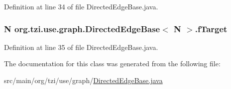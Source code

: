 Definition at line 34 of file Directed\-Edge\-Base.\-java.

\hypertarget{classorg_1_1tzi_1_1use_1_1graph_1_1_directed_edge_base_3_01_n_01_4_a3fff843b38aa9d153620fbe51cf29362}{
\subsubsection[{f\-Target}]{\setlength{\rightskip}{0pt plus 5cm}N org.\-tzi.\-use.\-graph.\-Directed\-Edge\-Base$<$ N $>$.f\-Target\hspace{0.3cm}{\ttfamily [protected]}}}\label{classorg_1_1tzi_1_1use_1_1graph_1_1_directed_edge_base_3_01_n_01_4_a3fff843b38aa9d153620fbe51cf29362}


Definition at line 35 of file Directed\-Edge\-Base.\-java.



The documentation for this class was generated from the following file\-:\begin{DoxyCompactItemize}
\item 
src/main/org/tzi/use/graph/\hyperlink{_directed_edge_base_8java}{Directed\-Edge\-Base.\-java}\end{DoxyCompactItemize}
